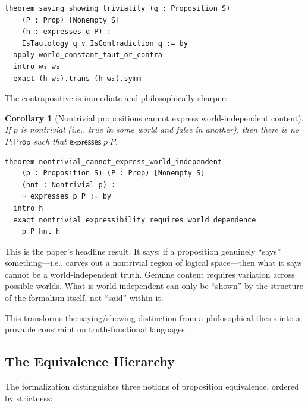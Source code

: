 \documentclass[10pt, letterpaper]{article}
\newtheorem{corollary}[theorem]{Corollary}
\theoremstyle{definition}
\theoremstyle{remark}
\newcommand{\Prop}{\mathsf{Prop}}
\newcommand{\expresses}{\mathsf{expresses}}
\begin{document}
\begin{lstlisting}
theorem saying_showing_triviality (q : Proposition S)
    (P : Prop) [Nonempty S]
    (h : expresses q P) :
    IsTautology q ∨ IsContradiction q := by
  apply world_constant_taut_or_contra
  intro w₁ w₂
  exact (h w₁).trans (h w₂).symm
\end{lstlisting}

\noindent
The contrapositive is immediate and philosophically sharper:

\begin{corollary}[Nontrivial propositions cannot express
world-independent content]
\label{cor:nontrivial}
If $p$ is nontrivial (i.e., true in some world and false in
another), then there is no $P : \Prop$ such that
$\expresses\;p\;P$.
\end{corollary}

\begin{lstlisting}
theorem nontrivial_cannot_express_world_independent
    (p : Proposition S) (P : Prop) [Nonempty S]
    (hnt : Nontrivial p) :
    ¬ expresses p P := by
  intro h
  exact nontrivial_expressibility_requires_world_dependence
    p P hnt h
\end{lstlisting}

\noindent
This is the paper's headline result.  It says: if a proposition
genuinely ``says'' something---i.e., carves out a nontrivial
region of logical space---then what it says cannot be a
world-independent truth.  Genuine content requires variation
across possible worlds.  What is world-independent can only be
``shown'' by the structure of the formalism itself, not ``said''
within it.

This transforms the saying/showing distinction from a
philosophical thesis into a provable constraint on
truth-functional languages.

\subsection{The Equivalence Hierarchy}
\label{sec:hierarchy}

The formalization distinguishes three notions of proposition
equivalence, ordered by strictness:
\end{document}
